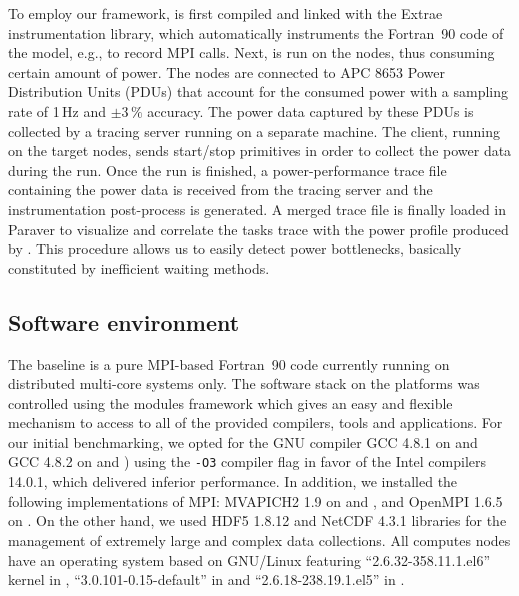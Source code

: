 To employ our  framework, \cosmoart is first compiled  and linked with
the  Extrae instrumentation  library, which  automatically instruments
the Fortran~90  code of the model,  e.g., to record  MPI calls.  Next,
\cosmoart  is run  on  the  nodes, thus  consuming  certain amount  of
power. The  nodes are connected  to APC 8653 Power  Distribution Units
(PDUs) that  account for  the consumed power  with a sampling  rate of
1\,Hz and $\pm3\,\%$  accuracy. The power data captured  by these PDUs
is  collected  by  a  \pmlib  tracing server  running  on  a  separate
machine.  The client, running  on the  target nodes,  sends start/stop
primitives in  order to  collect the power  data during  the \cosmoart
run.  Once  the  run  is  finished,  a  power-performance  trace  file
containing the power data is  received from the tracing server and the
instrumentation  post-process is  generated.  A  merged trace  file is
finally loaded in  Paraver to visualize and correlate  the tasks trace
with the  power profile produced by \cosmoart.   This procedure allows
us  to  easily  detect  power bottlenecks,  basically  constituted  by
inefficient waiting methods.

\subsection{Software environment}
\label{subsec:3.2}

The \cosmoart  baseline is a pure MPI-based  Fortran~90 code currently
running on distributed multi-core systems only.  The software stack on
the platforms  was controlled using the modules  framework which gives
an  easy and  flexible  mechanism to  access  to all  of the  provided
compilers, tools  and applications.  For our  initial benchmarking, we
opted for the GNU compiler GCC 4.8.1 on \monch and GCC 4.8.2 on \pilat
and \tinto) using the \texttt{-O3} compiler flag in favor of the Intel
compilers 14.0.1, which  delivered inferior performance.  In addition,
we  installed the following  implementations of  MPI: MVAPICH2  1.9 on
\monch and \pilat, and OpenMPI 1.6.5  on \tinto. On the other hand, we
used  HDF5 1.8.12  and NetCDF  4.3.1 libraries  for the  management of
extremely large and complex data collections.  All computes nodes have
an     operating    system     based     on    GNU/Linux     featuring
``2.6.32-358.11.1.el6'' kernel  in \monch, ``3.0.101-0.15-default'' in
\pilat and ``2.6.18-238.19.1.el5'' in \tinto.

